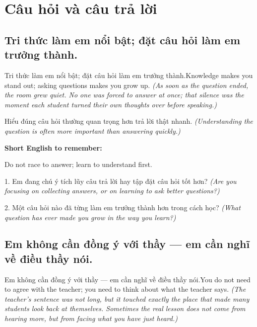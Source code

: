 \chapter{Câu hỏi và câu trả lời}


\section{Tri thức làm em nổi bật; đặt câu hỏi làm em trưởng thành.}
\begin{truyen}{Tri thức làm em nổi bật; đặt câu hỏi làm em trưởng thành.}{Knowledge makes you stand out; asking questions makes you grow up.}
\textit{(As soon as the question ended, the room grew quiet. No one was forced to answer at once; that silence was the moment each student turned their own thoughts over before speaking.)}
\end{truyen}

\begin{baihoc}
Hiểu đúng câu hỏi thường quan trọng hơn trả lời thật nhanh.
\textit{(Understanding the question is often more important than answering quickly.)}
\end{baihoc}

\begin{ghinhoanh}
\textbf{Short English to remember:}

Do not race to answer; learn to understand first.

\end{ghinhoanh}

\begin{tuhocnhanh}
1. Em đang chú ý tích lũy câu trả lời hay tập đặt câu hỏi tốt hơn? \textit{(Are you focusing on collecting answers, or on learning to ask better questions?)}

2. Một câu hỏi nào đã từng làm em trưởng thành hơn trong cách học? \textit{(What question has ever made you grow in the way you learn?)}
\end{tuhocnhanh}
\ngancach


\section{Em không cần đồng ý với thầy — em cần nghĩ về điều thầy nói.}
\begin{truyen}{Em không cần đồng ý với thầy — em cần nghĩ về điều thầy nói.}{You do not need to agree with the teacher; you need to think about what the teacher says.}
\textit{(The teacher's sentence was not long, but it touched exactly the place that made many students look back at themselves. Sometimes the real lesson does not come from hearing more, but from facing what you have just heard.)}
\end{truyen}

